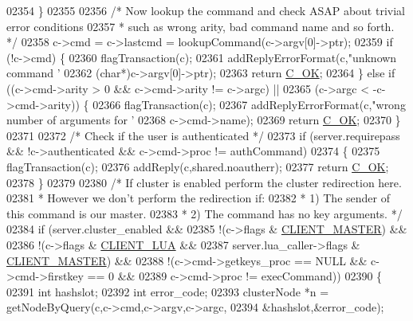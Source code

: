 \begin{DoxyCode}
{{{{{{{{{{{{{{{{{{{{{{{{{{{{{02354     \}
02355 
02356     \textcolor{comment}{/* Now lookup the command and check ASAP about trivial error conditions}
02357 \textcolor{comment}{     * such as wrong arity, bad command name and so forth. */}
02358     c->cmd = c->lastcmd = lookupCommand(c->argv[0]->ptr);
02359     \textcolor{keywordflow}{if} (!c->cmd) \{
02360         flagTransaction(c);
02361         addReplyErrorFormat(c,\textcolor{stringliteral}{"unknown command '%
02362             (\textcolor{keywordtype}{char}*)c->argv[0]->ptr);
02363         \textcolor{keywordflow}{return} \hyperlink{server_8h_a303769ef1065076e68731584e758d3e1}{C\_OK};
02364     \} \textcolor{keywordflow}{else} \textcolor{keywordflow}{if} ((c->cmd->arity > 0 && c->cmd->arity != c->argc) ||
02365                (c->argc < -c->cmd->arity)) \{
02366         flagTransaction(c);
02367         addReplyErrorFormat(c,\textcolor{stringliteral}{"wrong number of arguments for '%
02368             c->cmd->name);
02369         \textcolor{keywordflow}{return} \hyperlink{server_8h_a303769ef1065076e68731584e758d3e1}{C\_OK};
02370     \}
02371 
02372     \textcolor{comment}{/* Check if the user is authenticated */}
02373     \textcolor{keywordflow}{if} (server.requirepass && !c->authenticated && c->cmd->proc != authCommand)
02374     \{
02375         flagTransaction(c);
02376         addReply(c,shared.noautherr);
02377         \textcolor{keywordflow}{return} \hyperlink{server_8h_a303769ef1065076e68731584e758d3e1}{C\_OK};
02378     \}
02379 
02380     \textcolor{comment}{/* If cluster is enabled perform the cluster redirection here.}
02381 \textcolor{comment}{     * However we don't perform the redirection if:}
02382 \textcolor{comment}{     * 1) The sender of this command is our master.}
02383 \textcolor{comment}{     * 2) The command has no key arguments. */}
02384     \textcolor{keywordflow}{if} (server.cluster\_enabled &&
02385         !(c->flags & \hyperlink{server_8h_a3d8f0cc8d0653ee2b6dafb454292c069}{CLIENT\_MASTER}) &&
02386         !(c->flags & \hyperlink{server_8h_af9d0b0f45ef2c1fd29ac714a300de706}{CLIENT\_LUA} &&
02387           server.lua\_caller->flags & \hyperlink{server_8h_a3d8f0cc8d0653ee2b6dafb454292c069}{CLIENT\_MASTER}) &&
02388         !(c->cmd->getkeys\_proc == NULL && c->cmd->firstkey == 0 &&
02389           c->cmd->proc != execCommand))
02390     \{
02391         \textcolor{keywordtype}{int} hashslot;
02392         \textcolor{keywordtype}{int} error\_code;
02393         clusterNode *n = getNodeByQuery(c,c->cmd,c->argv,c->argc,
02394                                         &hashslot,&error\_code);
}}}}}}}}}}}}}}}}}}}}}}}}}}}}}}}
\end{DoxyCode}
